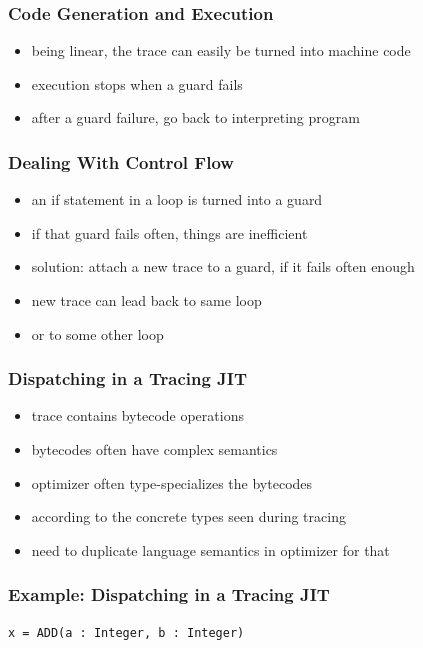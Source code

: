 \documentclass[utf8x]{beamer}
\begin{document}
\begin{frame}
    \frametitle{Code Generation and Execution}
    \begin{itemize}
    \item being linear, the trace can easily be turned into machine code
    \item execution stops when a guard fails
    \item after a guard failure, go back to interpreting program
    \end{itemize}
\end{frame}

\begin{frame}
  \frametitle{Dealing With Control Flow}
  \begin{itemize}
      \item an if statement in a loop is turned into a guard
      \item if that guard fails often, things are inefficient
      \item solution: attach a new trace to a guard, if it fails often enough
      \item new trace can lead back to same loop
      \item or to some other loop
  \end{itemize}
\end{frame}


\begin{frame}
  \frametitle{Dispatching in a Tracing JIT}
  \begin{itemize}
      \item trace contains bytecode operations
      \item bytecodes often have complex semantics
      \item optimizer often type-specializes the bytecodes
      \item according to the concrete types seen during tracing
      \item need to duplicate language semantics in optimizer for that
  \end{itemize}
\end{frame}

\begin{frame}[containsverbatim]
  \frametitle{Example: Dispatching in a Tracing JIT}
\begin{verbatim}
x = ADD(a : Integer, b : Integer)
\end{verbatim}
\end{frame}
\end{document}
